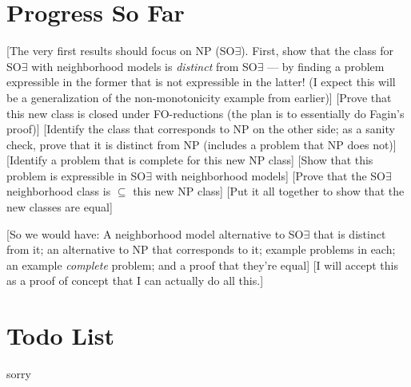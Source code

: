 \documentclass[letterpaper]{article}
\begin{document}
\section*{Progress So Far}
[The very first results should focus on NP (SO$\exists$).  First, show that the class for SO$\exists$ with neighborhood models is \emph{distinct} from SO$\exists$ --- by finding a problem expressible in the former that is not expressible in the latter! (I expect this will be a generalization of the non-monotonicity example from earlier)] [Prove that this new class is closed under FO-reductions (the plan is to essentially do Fagin's proof)] [Identify the class that corresponds to NP on the other side; as a sanity check, prove that it is distinct from NP (includes a problem that NP does not)] [Identify a problem that is complete for this new NP class] [Show that this problem is expressible in SO$\exists$ with neighborhood models] [Prove that the SO$\exists$ neighborhood class is $\subseteq$ this new NP class] [Put it all together to show that the new classes are equal]

[So we would have: A neighborhood model alternative to SO$\exists$ that is distinct from it; an alternative to NP that corresponds to it; example problems in each; an example \emph{complete} problem; and a proof that they're equal] [I will accept this as a proof of concept that I can actually do all this.]

\section*{Todo List}
\begin{todolist}
    \item sorry
\end{todolist}

\printbibliography
\end{document}
